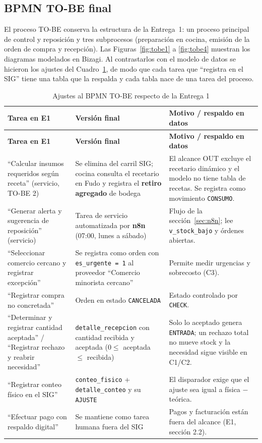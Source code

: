 \documentclass[11pt,letterpaper]{article}
\newcommand{\tablasize}{\footnotesize}
\begin{document}
\subsection{BPMN TO-BE final}
El proceso TO-BE conserva la estructura de la Entrega~1: un proceso principal de control y reposición y tres subprocesos (preparación en cocina, emisión de la orden de compra y recepción). Las Figuras~\ref{fig:tobe1} a \ref{fig:tobe4} muestran los diagramas modelados en Bizagi. Al contrastarlos con el modelo de datos se hicieron los ajustes del Cuadro~\ref{tab:bpmnajustes}, de modo que cada tarea que ``registra en el SIG'' tiene una tabla que la respalda y cada tabla nace de una tarea del proceso.

{\tablasize
\begin{longtable}{>{\raggedright\arraybackslash}p{4.2cm}>{\raggedright\arraybackslash}p{5.0cm}>{\raggedright\arraybackslash}p{5.4cm}}
\caption{Ajustes al BPMN TO-BE respecto de la Entrega 1}\label{tab:bpmnajustes}\\
\toprule \textbf{Tarea en E1} & \textbf{Versión final} & \textbf{Motivo / respaldo en datos} \\ \midrule \endfirsthead
\toprule \textbf{Tarea en E1} & \textbf{Versión final} & \textbf{Motivo / respaldo en datos} \\ \midrule \endhead
``Calcular insumos requeridos según receta'' (servicio, TO-BE 2) & Se elimina del carril SIG; cocina consulta el recetario en Fudo y registra el \textbf{retiro agregado} de bodega & El alcance OUT excluye el recetario dinámico y el modelo no tiene tabla de recetas. Se registra como movimiento \texttt{CONSUMO}. \\
``Generar alerta y sugerencia de reposición'' (servicio) & Tarea de servicio automatizada por \textbf{n8n} (07:00, lunes a sábado) & Flujo de la sección~\ref{sec:n8n}; lee \texttt{v\_stock\_bajo} y órdenes abiertas. \\
``Seleccionar comercio cercano y registrar excepción'' & Se registra como orden con \texttt{es\_urgente = 1} al proveedor ``Comercio minorista cercano'' & Permite medir urgencias y sobrecosto (C3). \\
``Registrar compra no concretada'' & Orden en estado \texttt{CANCELADA} & Estado controlado por \texttt{CHECK}. \\
``Determinar y registrar cantidad aceptada'' / ``Registrar rechazo y reabrir necesidad'' & \texttt{detalle\_recepcion} con cantidad recibida y aceptada ($0 \leq$ aceptada $\leq$ recibida) & Solo lo aceptado genera \texttt{ENTRADA}; un rechazo total no mueve stock y la necesidad sigue visible en C1/C2. \\
``Registrar conteo físico en el SIG'' & \texttt{conteo\_fisico} + \texttt{detalle\_conteo} y su \texttt{AJUSTE} & El disparador exige que el ajuste sea igual a física $-$ teórica. \\
``Efectuar pago con respaldo digital'' & Se mantiene como tarea humana fuera del SIG & Pagos y facturación están fuera del alcance (E1, sección 2.2). \\
\bottomrule
\end{longtable}
}
\end{document}
